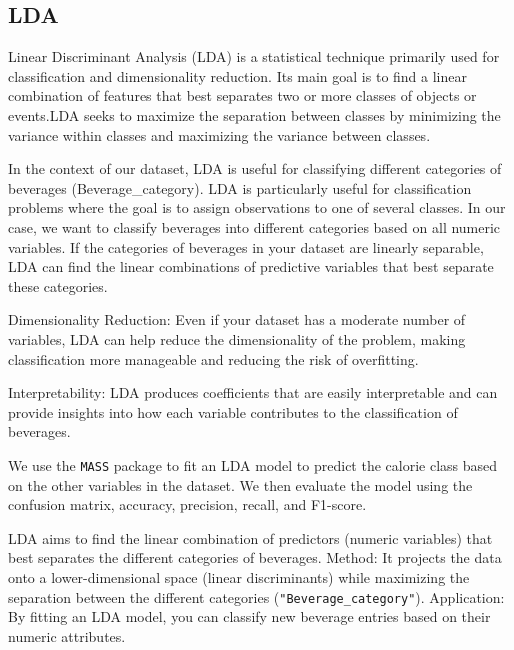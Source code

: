 \documentclass[
]{article}
\newenvironment{Shaded}{\begin{snugshade}}{\end{snugshade}}
\newcommand{\AttributeTok}[1]{\textcolor[rgb]{0.13,0.29,0.53}{#1}}
\newcommand{\FunctionTok}[1]{\textcolor[rgb]{0.13,0.29,0.53}{\textbf{#1}}}
\newcommand{\NormalTok}[1]{#1}
\newcommand{\OtherTok}[1]{\textcolor[rgb]{0.56,0.35,0.01}{#1}}
\newcommand{\SpecialCharTok}[1]{\textcolor[rgb]{0.81,0.36,0.00}{\textbf{#1}}}
\begin{document}
\subsection{LDA}\label{lda}

Linear Discriminant Analysis (LDA) is a statistical technique primarily
used for classification and dimensionality reduction. Its main goal is
to find a linear combination of features that best separates two or more
classes of objects or events.LDA seeks to maximize the separation
between classes by minimizing the variance within classes and maximizing
the variance between classes.

In the context of our dataset, LDA is useful for classifying different
categories of beverages (Beverage\_category). LDA is particularly useful
for classification problems where the goal is to assign observations to
one of several classes. In our case, we want to classify beverages into
different categories based on all numeric variables. If the categories
of beverages in your dataset are linearly separable, LDA can find the
linear combinations of predictive variables that best separate these
categories.

Dimensionality Reduction: Even if your dataset has a moderate number of
variables, LDA can help reduce the dimensionality of the problem, making
classification more manageable and reducing the risk of overfitting.

Interpretability: LDA produces coefficients that are easily
interpretable and can provide insights into how each variable
contributes to the classification of beverages.

We use the \texttt{MASS} package to fit an LDA model to predict the
calorie class based on the other variables in the dataset. We then
evaluate the model using the confusion matrix, accuracy, precision,
recall, and F1-score.

\begin{Shaded}
\end{Shaded}

LDA aims to find the linear combination of predictors (numeric
variables) that best separates the different categories of beverages.
Method: It projects the data onto a lower-dimensional space (linear
discriminants) while maximizing the separation between the different
categories (\texttt{"Beverage\_category"}). Application: By fitting an
LDA model, you can classify new beverage entries based on their numeric
attributes.
\end{document}
